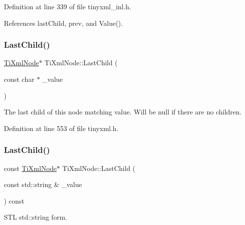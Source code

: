 Definition at line 339 of file tinyxml\+\_\+inl.\+h.



References last\+Child, prev, and Value().

\hypertarget{class_ti_xml_node_abad5bf1059c48127b958711ef89e8e5d}{}\label{class_ti_xml_node_abad5bf1059c48127b958711ef89e8e5d} 
\subsubsection{\texorpdfstring{Last\+Child()}{LastChild()}\hspace{0.1cm}{\footnotesize\ttfamily [4/6]}}
{\footnotesize\ttfamily \hyperlink{class_ti_xml_node}{Ti\+Xml\+Node}$\ast$ Ti\+Xml\+Node\+::\+Last\+Child (\begin{DoxyParamCaption}\item[{const char $\ast$}]{\+\_\+value }\end{DoxyParamCaption})\hspace{0.3cm}{\ttfamily [inline]}}



The last child of this node matching \textquotesingle{}value\textquotesingle{}. Will be null if there are no children. 



Definition at line 553 of file tinyxml.\+h.

\hypertarget{class_ti_xml_node_a96b721f14d5393dac70a0eff0d08520e}{}\label{class_ti_xml_node_a96b721f14d5393dac70a0eff0d08520e} 
\subsubsection{\texorpdfstring{Last\+Child()}{LastChild()}\hspace{0.1cm}{\footnotesize\ttfamily [5/6]}}
{\footnotesize\ttfamily const \hyperlink{class_ti_xml_node}{Ti\+Xml\+Node}$\ast$ Ti\+Xml\+Node\+::\+Last\+Child (\begin{DoxyParamCaption}\item[{const std\+::string \&}]{\+\_\+value }\end{DoxyParamCaption}) const\hspace{0.3cm}{\ttfamily [inline]}}



S\+TL std\+::string form. 



